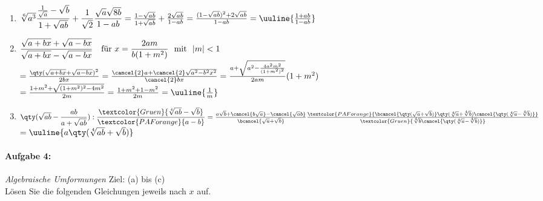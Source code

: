 \begin{enumerate}[label=(\alph*)]
    \item $\sqrt[6]{a^3}\dfrac{\frac{1}{\sqrt{a}}-\sqrt{b}}{1+\sqrt{ab}}+\dfrac{1}{\sqrt{2}}\dfrac{\sqrt{a}\sqrt{8b}}{1-ab} = \frac{1- \sqrt{ab}}{1+\sqrt{ab}} + \frac{2\sqrt{ab}}{1-ab} = \frac{(1-\sqrt{ab})^2 + 2\sqrt{ab}}{1-ab} =\uuline{\frac{1+ab}{1-ab}}$
    \item $\dfrac{\sqrt{a+bx}+\sqrt{a-bx}}{\sqrt{a+bx}-\sqrt{a-bx}} \quad \textnormal{für}\,\, x=\dfrac{2am}{b(1+m^2)}\,\,\textnormal{ mit }\,\, |m|<1$ \\
    $= \frac{\qty(\sqrt{a+bx}+\sqrt{a-bx})^2}{2bx} = \frac{\cancel{2}a + \cancel{2}\sqrt{a^2 - b^2 x^2}}{\cancel{2}bx}= \frac{a+\sqrt{a^2 - \frac{4a^2 m^2}{(1+m^2)^2}}}{2am}(1+m^2)$ \\
    $= \frac{1+m^2 + \sqrt{(1+m^2)^2 - 4m^2}}{2m} = \frac{1+m^2 +1 -m^2}{2m} = \uuline{\frac{1}{m}}$
    \item $\qty(\sqrt{ab}-\dfrac{ab}{a+\sqrt{ab}}):\dfrac{\textcolor{Gruen}{\sqrt[4]{ab}-\sqrt{b}}}{\textcolor{PAForange}{a-b}} = \frac{a \sqrt{b} + \cancel{b\sqrt{a}} - \cancel{\sqrt{a}b}}{\bcancel{\sqrt{a}+\sqrt{b}}} \frac{\textcolor{PAForange}{\bcancel{\qty(\sqrt{a}+\sqrt{b})} \qty(\sqrt[4]{a}+\sqrt[4]{b})\cancel{\qty(\sqrt[4]{a}-\sqrt[4]{b})}}}{\textcolor{Gruen}{\sqrt[4]{b}\cancel{\qty(\sqrt[4]{a}-\sqrt[4]{b})}}}$\\
    $ = \uuline{a\qty(\sqrt[4]{ab}+\sqrt{b})}$
\end{enumerate}

%
\newpage
\paragraph{Aufgabe 4: } \emph{Algebraische Umformungen} \hfill Ziel: (a) bis (c)\\[0.2cm]
Lösen Sie die folgenden Gleichungen jeweils nach $x$ auf.

